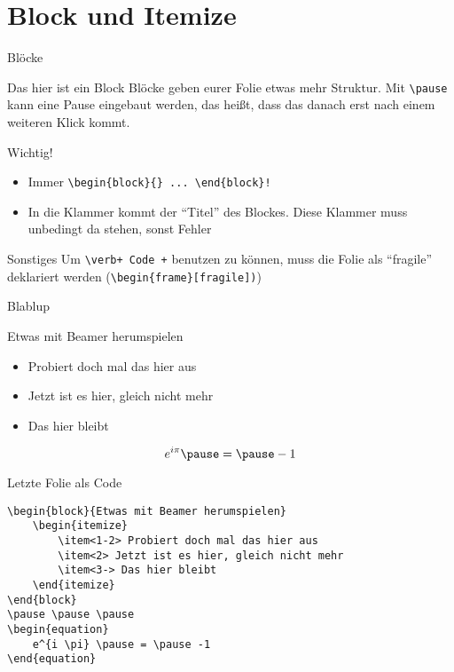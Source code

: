 \documentclass[hyperref={pdfpagelabels=false}]{beamer}
\begin{document}
\section{Block und Itemize}
\begin{frame}[fragile]{Blöcke}
	\begin{block}{Das hier ist ein Block}
		Blöcke geben eurer Folie etwas mehr Struktur. Mit \verb+\pause+ kann
		eine Pause eingebaut werden, das heißt, dass das danach erst nach einem
		weiteren Klick kommt.
	\end{block}
	\pause
	\begin{block}{Wichtig!}
		\begin{itemize}
			\item Immer \verb+\begin{block}{} ... \end{block}!+ \pause
			\item In die Klammer kommt der "`Titel"' des Blockes. Diese Klammer muss unbedingt da stehen, sonst Fehler
		\end{itemize}
	\end{block}
	\pause
	\begin{block}{Sonstiges}
		Um \verb!\verb+ Code +! benutzen zu können, muss die Folie als "`fragile"' deklariert werden (\verb+\begin{frame}[fragile])+)
	\end{block}
\end{frame}

\begin{frame}{Blablup}
		\begin{block}{Etwas mit Beamer herumspielen}
			\begin{itemize}
				\item<1-2> Probiert doch mal das hier aus
				\item<2> Jetzt ist es hier, gleich nicht mehr
				\item<3-> Das hier bleibt
			\end{itemize}
			\end{block}
		    \pause \pause \pause
			\begin{equation}
			e^{i \pi} \pause = \pause -1
			\end{equation}
\end{frame}
\begin{frame}[fragile]{Letzte Folie als Code}
        \begin{Verbatim}
\begin{block}{Etwas mit Beamer herumspielen}
    \begin{itemize}
        \item<1-2> Probiert doch mal das hier aus
        \item<2> Jetzt ist es hier, gleich nicht mehr
        \item<3-> Das hier bleibt
    \end{itemize}
\end{block}
\pause \pause \pause
\begin{equation}
    e^{i \pi} \pause = \pause -1
\end{equation}
        \end{Verbatim}
\end{frame}
\end{document}
